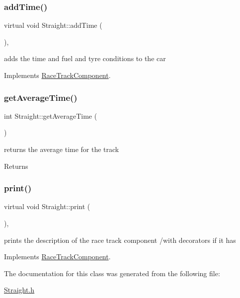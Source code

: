 \subsubsection{\texorpdfstring{add\+Time()}{addTime()}}
{\footnotesize\ttfamily virtual void Straight\+::add\+Time (\begin{DoxyParamCaption}{ }\end{DoxyParamCaption})\hspace{0.3cm}{\ttfamily [inline]}, {\ttfamily [virtual]}}

adds the time and fuel and tyre conditions to the car 

Implements \mbox{\hyperlink{class_race_track_component_aa815404c45ba7df3786c3add177eb7e6}{Race\+Track\+Component}}.

\mbox{\label{class_straight_ae8851ae19372aeaa8a61b17114c78754}} 
\subsubsection{\texorpdfstring{get\+Average\+Time()}{getAverageTime()}}
{\footnotesize\ttfamily int Straight\+::get\+Average\+Time (\begin{DoxyParamCaption}{ }\end{DoxyParamCaption})\hspace{0.3cm}{\ttfamily [inline]}}

returns the average time for the track \begin{DoxyReturn}{Returns}

\end{DoxyReturn}
\mbox{\label{class_straight_ae95d3bdc1d16c97c8d6a6ab60e3205e4}} 
\subsubsection{\texorpdfstring{print()}{print()}}
{\footnotesize\ttfamily virtual void Straight\+::print (\begin{DoxyParamCaption}{ }\end{DoxyParamCaption})\hspace{0.3cm}{\ttfamily [inline]}, {\ttfamily [virtual]}}

prints the description of the race track component /with decorators if it has 

Implements \mbox{\hyperlink{class_race_track_component_a02a8d9520cfd80f31dd94b5fa1e76d47}{Race\+Track\+Component}}.



The documentation for this class was generated from the following file\+:\begin{DoxyCompactItemize}
\item 
\mbox{\hyperlink{_straight_8h}{Straight.\+h}}\end{DoxyCompactItemize}
